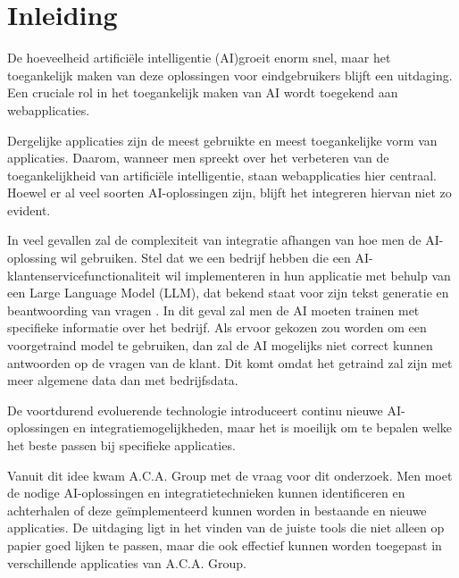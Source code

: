 \documentclass[dutch]{hogent-article}
\begin{document}

\section{Inleiding}%
\label{sec:Introduction}


De hoeveelheid artificiële intelligentie (AI)\linebreak groeit enorm snel, maar het toegankelijk maken van deze oplossingen voor eindgebruikers blijft een uitdaging. Een cruciale rol in het toegankelijk maken van AI wordt toegekend aan webapplicaties.
  \setlength{\parskip}{1em}
  
  Dergelijke applicaties zijn de meest gebruikte en meest toegankelijke vorm van applicaties.\linebreak
  Daarom, wanneer men spreekt over het verbeteren van de toegankelijkheid van artificiële intelligentie, staan webapplicaties hier centraal. Hoewel er al veel soorten AI-oplossingen zijn, blijft het integreren hiervan niet zo evident.
  
  In veel gevallen zal de complexiteit van integratie afhangen van hoe men de AI-oplossing wil gebruiken. Stel dat we een bedrijf hebben die een AI-klantenservicefunctionaliteit wil implementeren in hun applicatie met behulp van een Large Language Model (LLM), dat bekend staat voor zijn tekst generatie en beantwoording van vragen \autocite{Zhang2023}. In dit geval zal men de AI moeten trainen met specifieke informatie over het bedrijf. Als ervoor gekozen zou worden om een voorgetraind model te gebruiken, dan zal de AI mogelijks niet correct kunnen antwoorden op de vragen van de klant. Dit komt omdat het getraind zal zijn met meer algemene data dan met bedrijfsdata.
  
  De voortdurend evoluerende technologie introduceert continu nieuwe AI-oplossingen en integratiemogelijkheden, maar het is moeilijk om te bepalen welke het beste passen bij specifieke applicaties. 
  
  Vanuit dit idee kwam A.C.A. Group met de vraag voor dit onderzoek. Men moet de nodige AI-oplossingen en integratietechnieken kunnen identificeren en achterhalen of deze geïmplementeerd kunnen worden in bestaande en nieuwe applicaties. De uitdaging ligt in het vinden van de juiste tools die niet alleen op papier goed lijken te passen, maar die ook effectief kunnen worden toegepast in verschillende applicaties van A.C.A. Group. 
  
\end{document}
